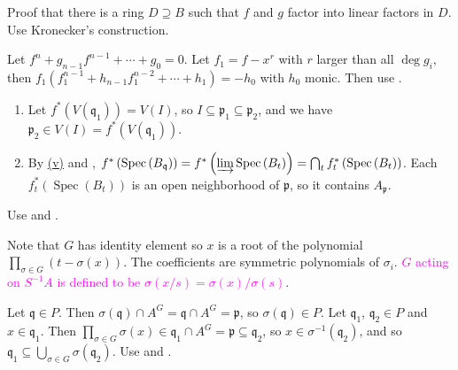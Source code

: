 \begin{exercise}\label{ex5.8}
	Proof that there is a ring $D\supseteq B$ such that $f$ and $g$ factor into linear factors in $D$. Use Kronecker's construction.
\end{exercise}

\begin{exercise}\label{ex5.9}
	Let $f^n+g_{n-1}f^{n-1}+\cdots+g_0=0$. Let $f_1=f-x^r$ with $r$ larger than all $\operatorname{deg}g_i$, then $f_1\left(f_1^{n-1}+h_{n-1}f_1^{n-2}+\cdots+h_1\right)=-h_0$ with $h_0$ monic. Then use .
\end{exercise}

\begin{exercise}\label{ex5.10}
	\begin{enumerate}
		\item[(a) $\Rightarrow$ (b)] Let $f^*(V(\mathfrak{q}_1))=V(I)$, so $I\subseteq\mathfrak{p}_1\subseteq\mathfrak{p}_2$, and we have $\mathfrak{p}_2\in V(I)=f^*(V(\mathfrak{q}_1))$.
		\item[(a') $\Rightarrow$ (c')] By \hyperref[ex3.23]{(v)} and , $f^*\left(\operatorname{Spec}\left(B_\mathfrak{q}\right)\right)=f^*\left(\varinjlim\operatorname{Spec}\left(B_t\right)\right)=\bigcap_tf_t^*\left(\operatorname{Spec}\left(B_t\right)\right)$. Each $f_t^*\left(\operatorname{Spec}\left(B_t\right)\right)$ is an open neighborhood of $\mathfrak{p}$, so it contains $A_\mathfrak{p}$.
	\end{enumerate}
\end{exercise}

\begin{exercise}\label{ex5.11}
	Use  and .
\end{exercise}

\begin{exercise}\label{ex5.12}
	Note that $G$ has identity element so $x$ is a root of the polynomial $\prod_{\sigma\in G}\left(t-\sigma(x)\right)$. The coefficients are symmetric polynomials of $\sigma_i$. \textcolor{magenta}{$G$ acting on $S^{-1}A$ is defined to be $\sigma(x/s)=\sigma(x)/\sigma(s)$}.
\end{exercise}

\begin{exercise}\label{ex5.13}
	Let $\mathfrak{q}\in P$. Then $\sigma(\mathfrak{q})\cap A^G=\mathfrak{q}\cap A^G=\mathfrak{p}$, so $\sigma(\mathfrak{q})\in P$. Let $\mathfrak{q}_1$, $\mathfrak{q}_2\in P$ and $x\in\mathfrak{q}_1$. Then $\prod_{\sigma\in G}\sigma(x)\in\mathfrak{q}_1\cap A^G=\mathfrak{p}\subseteq\mathfrak{q}_2$, so $x\in\sigma^{-1}\left(\mathfrak{q}_2\right)$, and so $\mathfrak{q}_1\subseteq\bigcup_{\sigma\in G}\sigma\left(\mathfrak{q}_2\right)$. Use  and .
\end{exercise}

